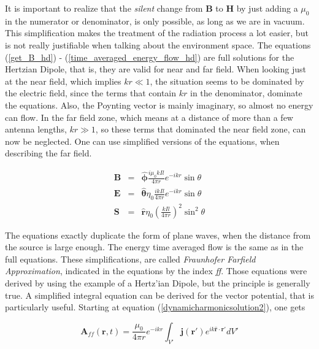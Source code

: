 \documentclass[a4paper,14pt]{extbook}
\begin{document}
It is important to realize that the \emph{silent} change from \textbf{B} to \textbf{H} by just adding a $\mu_0$ in the numerator or denominator, is only possible, as long as we are in vacuum. This simplification makes the treatment of the radiation process a lot easier, but is not really justifiable when talking about the environment space. The equations (\ref{get_B_hd}) - (\ref{time_averaged_energy_flow_hd}) are full solutions for the Hertzian Dipole, that is, they are valid for near and far field. When looking just at the near field, which implies $kr\ll 1$, the situation seems to be dominated by the electric field, since the terms that contain $kr$ in the denominator, dominate the equations. Also, the Poynting vector is mainly imaginary, so almost no energy can flow. In the far field zone, which means at a distance of more than a few antenna lengths, $kr \gg 1$, so these terms  that dominated the near field zone, can now be neglected. One can use simplified versions of the equations, when describing the far field.

\begin{eqnarray}
\mathbf{B} &=& \mathbf{\hat{\phi}} \frac{i \mu_0 k I l}{4 \pi r} e^{-ikr } \sin \theta \label{fraunhofer_B} \\
\mathbf{E} &=&\mathbf{ \hat{\theta}} \eta_0 \frac{i k I l}{4 \pi r} e^{-ikr } \sin \theta \label{fraunhofer_E} \\
\mathbf{S} &=& \mathbf{\hat{r}} \eta_0 \left( \frac{ k I l}{4 \pi r}\right)^2 \sin^2 \theta  \label{fraunhofer_S}
\end{eqnarray}

The equations exactly duplicate the form of plane waves, when the distance from the source is large enough. The energy time averaged flow is the same as in the full equations. These simplifications, are called \emph{Fraunhofer Farfield Approximation}, indicated in the equations by the index \emph{ff}. Those equations were derived by using the example of a Hertz'ian Dipole, but the principle is generally true. A simplified integral equation can be derived for the vector potential, that is particularly useful. Starting at equation (\ref{dynamicharmonicsolution2}), one gets

\begin{equation}\label{fraunhofer_A}
 \mathbf{A}_{ff}(\mathbf{r},t) = \frac{\mu_0}{4 \pi r} e^{-ikr} \int_{V'} \mathbf{j}(\mathbf{r}') e^{ik \mathbf{\hat{r}} \cdot \mathbf{r}' } dV'
\end{equation}
\end{document}
